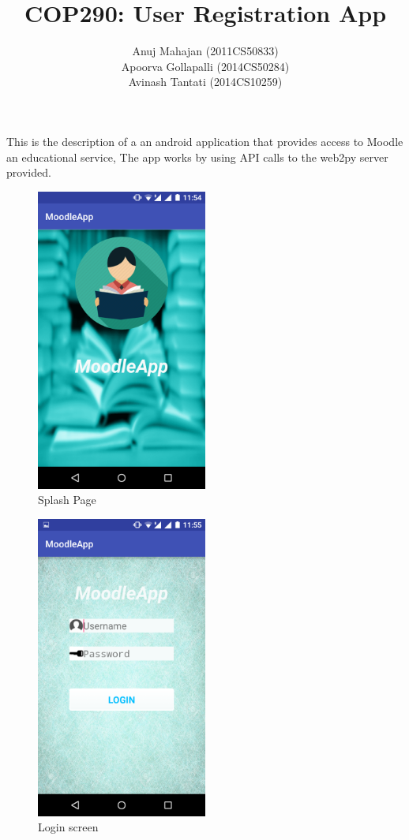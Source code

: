 \documentclass[12pt]{article}
\title{COP290: User Registration App}
\author{Anuj Mahajan (2011CS50833) \\ Apoorva Gollapalli (2014CS50284) \\ Avinash Tantati (2014CS10259) }
\begin{document}
\maketitle

This is the description of a an android application that provides access to Moodle an educational service, The app works by using API calls to the web2py server provided. 


\begin{figure}[!ht]
	\centering
	\includegraphics[width=0.5\textwidth]{./splash}
	\caption{Splash Page}
\end{figure}

\begin{figure}[!ht]
	\centering
	\includegraphics[width=0.5\textwidth]{./login}
	\caption{Login screen}
\end{figure}
\end{document}
